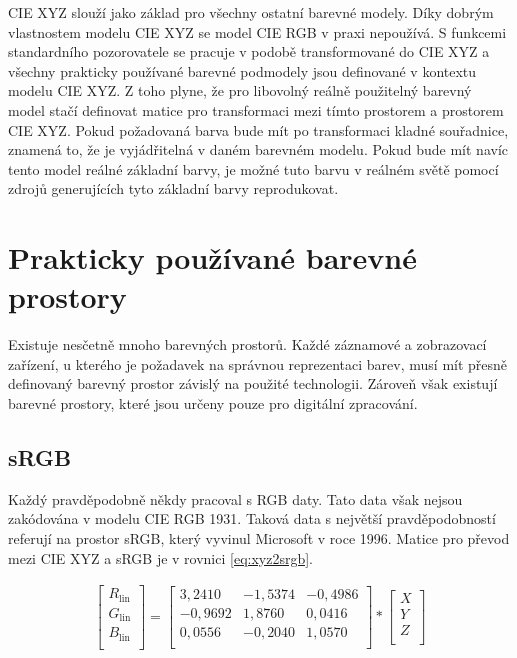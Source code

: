 \documentclass[a4paper, 12pt, titlepage]{article}
\begin{document}
  CIE XYZ slouží jako základ pro všechny ostatní barevné modely.
  Díky dobrým vlastnostem modelu CIE XYZ se model CIE RGB v praxi nepoužívá.
  S funkcemi standardního pozorovatele se pracuje v podobě transformované do CIE XYZ a všechny prakticky používané barevné podmodely jsou definované v kontextu modelu CIE XYZ.
  Z toho plyne, že pro libovolný reálně použitelný barevný model stačí definovat matice pro transformaci mezi tímto prostorem a prostorem CIE XYZ.
  Pokud požadovaná barva bude mít po transformaci kladné souřadnice, znamená to, že je vyjádřitelná v daném barevném modelu.
  Pokud bude mít navíc tento model reálné základní barvy, je možné tuto barvu v reálném světě pomocí zdrojů generujících tyto základní barvy reprodukovat. \cite{Abraham2016}

  \section{Prakticky používané barevné prostory}
  Existuje nesčetně mnoho barevných prostorů.
  Každé záznamové a zobrazovací zařízení, u kterého je požadavek na správnou reprezentaci barev, musí mít přesně definovaný barevný prostor závislý na použité technologii.
  Zároveň však existují barevné prostory, které jsou určeny pouze pro digitální zpracování.

  \subsection{sRGB}
  Každý pravděpodobně někdy pracoval s RGB daty.
  Tato data však nejsou zakódována v modelu CIE RGB 1931.
  Taková data s největší pravděpodobností referují na prostor sRGB, který vyvinul Microsoft v roce 1996.
  Matice pro převod mezi CIE XYZ a sRGB je v rovnici \ref{eq:xyz2srgb}.

  \begin{align}
    \begin{bmatrix}
      R_{\mathrm{lin}}\\
      G_{\mathrm{lin}}\\
      B_{\mathrm{lin}}\\
    \end{bmatrix}
    =
    \begin{bmatrix}
       3,2410 & -1,5374 & -0,4986\\
      -0,9692 &  1,8760 &  0,0416\\
       0,0556 & -0,2040 &  1,0570\\
    \end{bmatrix}
    *
    \begin{bmatrix}
      X\\
      Y\\
      Z\\
    \end{bmatrix}
    \label{eq:xyz2srgb}
  \end{align}
\end{document}
